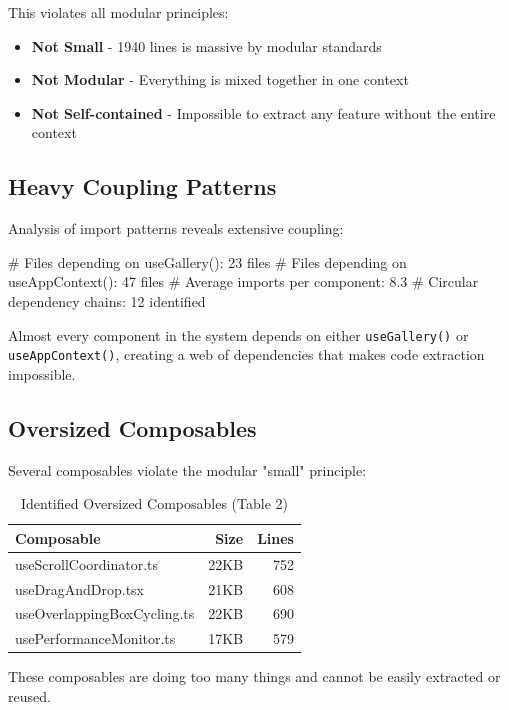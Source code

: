 \documentclass[11pt]{article}
\begin{document}
This violates all modular principles:
\begin{itemize}
\item \textbf{Not Small} - 1940 lines is massive by modular standards
\item \textbf{Not Modular} - Everything is mixed together in one context
\item \textbf{Not Self-contained} - Impossible to extract any feature without the entire context
\end{itemize}

\subsection{Heavy Coupling Patterns}

Analysis of import patterns reveals extensive coupling:

\begin{bashcode}
# Files depending on useGallery(): 23 files
# Files depending on useAppContext(): 47 files  
# Average imports per component: 8.3
# Circular dependency chains: 12 identified
\end{bashcode}

Almost every component in the system depends on either \texttt{useGallery()} or \texttt{useAppContext()}, creating a web of dependencies that makes code extraction impossible.

\subsection{Oversized Composables}

Several composables violate the modular "small" principle:

\begin{table}[h]
\centering
\begin{tabular}{|l|r|r|}
\hline
\textbf{Composable} & \textbf{Size} & \textbf{Lines} \\
\hline
useScrollCoordinator.ts & 22KB & 752 \\
useDragAndDrop.tsx & 21KB & 608 \\
useOverlappingBoxCycling.ts & 22KB & 690 \\
usePerformanceMonitor.ts & 17KB & 579 \\
\hline
\end{tabular}
\caption{Identified Oversized Composables (Table 2)}
\end{table}
\label{table:oversized-composables}

These composables are doing too many things and cannot be easily extracted or reused.
\end{document}
